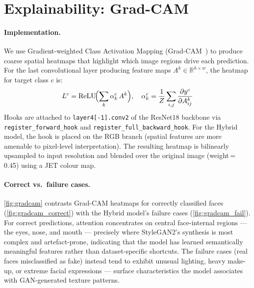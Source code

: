 \section{Explainability: Grad-CAM}
\label{sec:gradcam}

\paragraph{Implementation.}
We use Gradient-weighted Class Activation Mapping
(Grad-CAM~\cite{selvaraju2017gradcam}) to produce coarse spatial heatmaps
that highlight which image regions drive each prediction.
For the last convolutional layer producing feature maps
$A^k \in \mathbb{R}^{h \times w}$, the heatmap for target class $c$ is:
\begin{equation}
  L^c = \mathrm{ReLU}\!\Bigl(\sum_k \alpha_k^c\, A^k\Bigr),\quad
  \alpha_k^c = \frac{1}{Z}\sum_{i,j}
    \frac{\partial y^c}{\partial A^k_{ij}}
  \label{eq:gradcam}
\end{equation}
Hooks are attached to \texttt{layer4[-1].conv2} of the ResNet18 backbone
via \texttt{register\_forward\_hook} and
\texttt{register\_full\_backward\_hook}.
For the Hybrid model, the hook is placed on the RGB branch (spatial features
are more amenable to pixel-level interpretation).
The resulting heatmap is bilinearly upsampled to input resolution and blended
over the original image (weight\,=\,0.45) using a JET colour map.

\paragraph{Correct vs.\ failure cases.}
\cref{fig:gradcam} contrasts Grad-CAM heatmaps for correctly classified
faces (\cref{fig:gradcam_correct}) with the Hybrid model's failure cases
(\cref{fig:gradcam_fail}).
For correct predictions, attention concentrates on central face-internal
regions — the eyes, nose, and mouth — precisely where StyleGAN2's synthesis
is most complex and artefact-prone, indicating that the model has learned
semantically meaningful features rather than dataset-specific shortcuts.
The failure cases (real faces misclassified as fake) instead tend to exhibit
unusual lighting, heavy make-up, or extreme facial expressions — surface
characteristics the model associates with GAN-generated texture patterns.


